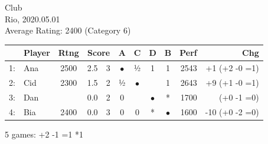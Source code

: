 \documentclass{scrartcl}
\begin{document}
\setlength{\parindent}{0cm}
\small
Club\\
Rio, 2020.05.01\\
Average Rating: 2400  (Category 6)

\begin{longtable}{rlcr@{/}rc@{ }c@{ }c@{ }crr}
\toprule
  & \bfseries Player & \bfseries  Rtng & \multicolumn{2}{c}{\bfseries Score} &  \ttfamily A & \ttfamily C & \ttfamily D & \ttfamily B &   \bfseries Perf & \bfseries Chg \\
\midrule
\endhead
 1:  & Ana  & 2500  &  2.5  &  3   & $\bullet$ & ½ & 1 & 1 &   2543 &  +1  (+2 -0 =1) \\
 2:  & Cid  & 2300  &  1.5  &  2   & ½ & $\bullet$ &  & 1 &   2643 &  +9  (+1 -0 =1) \\
 3:  & Dan  &       &  0.0  &  2   & 0 &  & $\bullet$ & * &   1700     &  (+0 -1 =0) \\
 4:  & Bia  & 2400  &  0.0  &  3   & 0 & 0 & * & $\bullet$ &   1600 & -10  (+0 -2 =0) \\
\bottomrule
\end{longtable}
5 games: +2 -1 =1 *1
\end{document}
